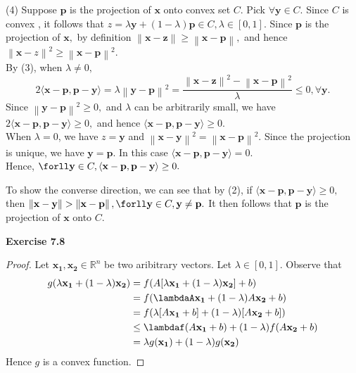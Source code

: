 \documentclass[letterpaper,12pt]{article}
\theoremstyle{definition}
\renewcommand{\vec}[1]{\mathbf{#1}}
\newcommand\norm[1]{\left\lVert#1\right\rVert}
\begin{document}
(4) Suppose $\vec{p} $ is the projection of $\vec{x} $ onto convex  set $C.$ Pick $\forall \vec{y}  \in C.$
Since $C$ is convex , it follows that $z = \lambda \vec{y}  + (1-\lambda) \vec{p}  \in C, \lambda \in [0,1].$ Since $\vec{p} $ is the projection of $\vec{x} ,$ by  definition $\norm{\vec{x} - \vec{z}} \geq \norm{\vec{x} -\vec{p} },$ and hence $\norm{\vec{x} -z}^2 \geq \norm{\vec{x} -\vec{p} }^2.$ \\
By (3), when $\lambda \neq 0,$ $$2\langle \vec{x} -\vec{p} , \vec{p} -\vec{y} \rangle  = \lambda \norm{\vec{y} -\vec{p} }^2 = \frac{\norm{\vec{x} - \vec{z}}^2- \norm{\vec{x} -\vec{p} }^2}{\lambda} \leq 0, \forall \vec{y} .$$ Since $\norm{\vec{y} -\vec{p} }^2 \geq 0,$
and $\lambda$ can be arbitrarily  small, we have $2\langle \vec{x} -\vec{p} , \vec{p} -\vec{y} \rangle  \geq 0,$ and hence $\langle \vec{x} -\vec{p} , \vec{p} -\vec{y} \rangle  \geq 0.$ \\
When $ \lambda = 0$, we have $z = \vec{y} $ and $\norm{\vec{x} -\vec{y} }^2 = \norm{\vec{x} -\vec{p} }^2.$ Since the projection is unique, we have $\vec{y} =\vec{p} .$ In this case $\langle \vec{x} -\vec{p} , \vec{p} -\vec{y} \rangle  = 0.$ \\
Hence, $\forll \vec{y}  \in C, \langle \vec{x} -\vec{p} , \vec{p} -\vec{y} \rangle  \geq 0.$

To show the converse direction, we can see that by (2), if $\langle \vec{x} -\vec{p} , \vec{p} -\vec{y} \rangle  \geq 0,$ then $\norm{\vec{x} -\vec{y} } > \norm{\vec{x} -\vec{p} }, \forll \vec{y} \in C, \vec{y}  \neq \vec{p} .$
It then follows that $\vec{p} $ is the projection of $\vec{x} $ onto $C$.

\noindent\textbf{Exercise 7.8}
\begin{proof}
  Let $\vec{x_1} , \vec{x_2}  \in \mathbb{R}^n$ be two aribitrary vectors. Let $\lambda \in [0,1].$ Observe that
  \begin{align*}
    g(\lambda \vec{x_1}  + (1-\lambda) \vec{x_2} ) &= f(A[\lambda \vec{x_1}  +(1-\lambda)\vec{x_2} ] + b) \\
    &= f(\lambdaA\vec{x_1}  + (1-\lambda)A \vec{x_2}  + b) \\
    &= f(\lambda[A\vec{x_1}  + b] + (1-\lambda)[A\vec{x_2}  + b])\\
    &\leq \lambdaf(A\vec{x_1}  + b) + (1-\lambda)f(A\vec{x_2}  + b)\\
    &=\lambda g(\vec{x_1} ) + (1-\lambda)g(\vec{x_2} )
  \end{align*}
  Hence $g$ is a convex function.
\end{proof}
\end{document}
